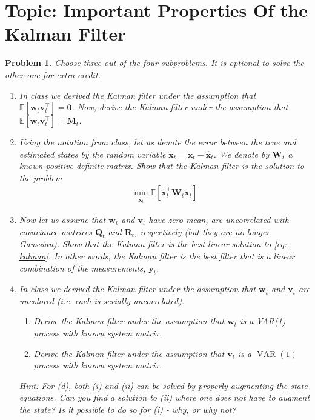 \documentclass[11pt]{article}
\theoremstyle{plain} %
\newtheorem{problem}[theorem]{Problem}
\theoremstyle{remark}
\begin{document}
\section{Topic: Important Properties Of the Kalman Filter}
\begin{problem}
Choose three out of the four subproblems. It is optional to solve the other one
for extra credit.
\begin{enumerate}[label=(\alph*)]
  \item In class we derived the Kalman filter under the assumption that
        $\mathbb{E}\left[\mathbf{w}_t \mathbf{v}_t^\top\right]=\mathbf{0}$. Now,
        derive the Kalman filter under the assumption that
        $\mathbb{E}\left[\mathbf{w}_t \mathbf{v}_t^\top\right]=\mathbf{M}_t$.
  \item Using the notation from class, let us denote the error between the true
        and estimated states by the random variable
        $\tilde{\mathbf{x}}_t=\mathbf{x}_t-\hat{\mathbf{x}}_t$. We denote by
        $\mathbf{W}_t$ a known positive definite matrix. Show that the Kalman filter
        is the solution to the problem
        \begin{align}
          \min _{\hat{\mathbf{x}}_t} \mathbb{E}\left[\tilde{\mathbf{x}}_t^\top \mathbf{W}_t \tilde{\mathbf{x}}_t\right]\label{eq: kalman}
        \end{align}
  \item Now let us assume that $\mathbf{w}_t$ and $\mathbf{v}_t$ have zero mean,
        are uncorrelated with covariance matrices $\mathbf{Q}_t$ and $\mathbf{R}_t$,
        respectively (but they are no longer Gaussian). Show that the Kalman filter is
        the best linear solution to \cref{eq: kalman}. In other words, the Kalman
        filter is the best filter that is a linear combination of the measurements,
        $\mathbf{y}_t$.
  \item In class we derived the Kalman filter under the assumption that
        $\mathbf{w}_t$ and $\mathbf{v}_t$ are uncolored (i.e. each is serially
        uncorrelated).
        \begin{enumerate}[label=(\roman*)]
          \item Derive the Kalman filter under the assumption that
                $\mathbf{w}_t$ is a VAR(1) process with known system matrix.
          \item Derive the Kalman filter under the assumption that
                $\mathbf{v}_t$ is a $\operatorname{VAR}(1)$ process with known
                system matrix.
        \end{enumerate}
        Hint: For (d), both (i) and (ii) can be solved by properly augmenting
        the state equations. Can you find a solution to (ii) where one does not
        have to augment the state? Is it possible to do so for (i) - why, or why
        not?
\end{enumerate}

\end{problem}
\end{document}
